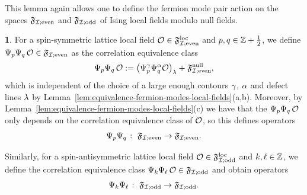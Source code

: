 \documentclass[12pt,oneside,english]{amsart}
\numberwithin{equation}{section}
\numberwithin{figure}{section}
\theoremstyle{plain}
\theoremstyle{plain}
\theoremstyle{plain}
\theoremstyle{plain}
\theoremstyle{remark}
\theoremstyle{definition}
\newtheorem{defn}[thm]{\protect\definitionname}
\theoremstyle{plain}
\theoremstyle{plain}
\numberwithin{thm}{section}
\providecommand{\definitionname}{Definition}
\providecommand{\definitionname}{Definition}
\providecommand{\definitionname}{Definition}
\providecommand{\definitionname}{Definition}
\begin{document}
This lemma again allows one to define the fermion mode pair action on the spaces
$\mathfrak{F}_{\mathcal{I}; \mathrm{even}}$ and $\mathfrak{F}_{\mathcal{I}; \mathrm{odd}}$ of Ising local fields 
modulo null fields. 
\begin{defn}
\label{def:fermion-bilinear-modes}
\label{def:current-modes-gff}
For a spin-symmetric lattice local field ${\mathcal{O}} \in \mathfrak{F}^\mathrm{loc}_{\mathcal{I}; \mathrm{even}}$
and $p,q \in \mathbb{Z} + \frac{1}{2}$, we define
${\Psi}_{p} {\Psi}_{q} \, {\mathcal{O}}
\in \mathfrak{F}_{\mathcal{I}; \mathrm{even}}$ as the correlation equivalence class
\begin{align*}
{\Psi}_{p} {\Psi}_{q} \, {\mathcal{O}} :=
\big( {\Psi}^{\gamma}_{p} {\Psi}^{\alpha}_{q}
    {\mathcal{O}} \big)_{{\lambda}} + \mathfrak{F}^\mathrm{null}_{\mathcal{I}; \mathrm{even}} ,
\end{align*}
which is independent of the choice of a large 
enough contours $\gamma$, $\alpha$ and defect lines
${\lambda}$ by Lemma~\ref{lem:equivalence-fermion-modes-local-fields}(a,b).
Moreover, by Lemma~\ref{lem:equivalence-fermion-modes-local-fields}(c) we have 
that
the ${\Psi}_{p} {\Psi}_{q} \, {\mathcal{O}}$ only 
depends on the correlation equivalence class of ${\mathcal{O}}$, so this defines 
operators
\[ {\Psi}_{p} {\Psi}_{q} \; \colon \;
\mathfrak{F}_{\mathcal{I}; \mathrm{even}} \to \mathfrak{F}_{\mathcal{I}; \mathrm{even}} . \]

Similarly, for a spin-antisymmetric lattice local field
${\mathcal{O}} \in \mathfrak{F}^\mathrm{loc}_{\mathcal{I}; \mathrm{odd}}$ and $k,\ell \in \mathbb{Z}$, we define
the correlation equivalence class
${\Psi}_{k} {\Psi}_{\ell} \, {\mathcal{O}}
\in \mathfrak{F}_{\mathcal{I}; \mathrm{odd}}$ and obtain operators
\[ {\Psi}_{k} {\Psi}_{\ell} \; \colon \;
\mathfrak{F}_{\mathcal{I}; \mathrm{odd}} \to \mathfrak{F}_{\mathcal{I}; \mathrm{odd}} . \]
\end{defn}
\end{document}

